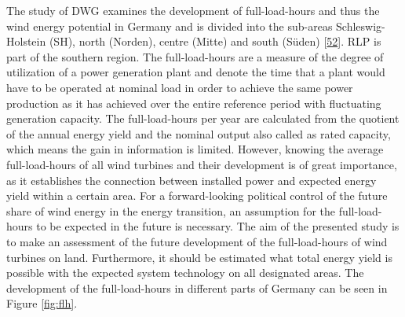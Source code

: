 \documentclass[a4paper,11pt]{article}
\begin{document}
The study of DWG examines the development of full-load-hours and thus the wind energy potential in Germany and is divided into the sub-areas Schleswig-Holstein (SH), north (Norden), centre (Mitte) and south (Süden) {[}\protect\hyperlink{ref-RasmusBorrmannDr.KnudRehfeldtDr.DennisKruse.2020}{52}{]}. RLP is part of the southern region. The full-load-hours are a measure of the degree of utilization of a power generation plant and denote the time that a plant would have to be operated at nominal load in order to achieve the same power production as it has achieved over the entire reference period with fluctuating generation capacity. The full-load-hours per year are calculated from the quotient of the annual energy yield and the nominal output also called as rated capacity, which means the gain in information is limited. However, knowing the average full-load-hours of all wind turbines and their development is of great importance, as it establishes the connection between installed power and expected energy yield within a certain area. For a forward-looking political control of the future share of wind energy in the energy transition, an assumption for the full-load-hours to be expected in the future is necessary. The aim of the presented study is to make an assessment of the future development of the full-load-hours of wind turbines on land. Furthermore, it should be estimated what total energy yield is possible with the expected system technology on all designated areas. The development of the full-load-hours in different parts of Germany can be seen in Figure \ref{fig:flh}.
\end{document}
